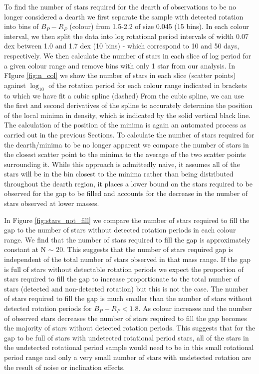 To find the number of stars required for the dearth of observations to be no longer considered a dearth we first separate the sample with detected rotation into bins of $B_P - R_P$ (colour) from 1.5-2.2 of size 0.045 (15 bins).
In each colour interval, we then split the data into log rotational period intervals of width 0.07 dex between 1.0 and 1.7 dex (10 bins) - which correspond to 10 and 50 days, respectively.
We then calculate the number of stars in each slice of log period for a given colour range and remove bins with only 1 star from our analysis.
In FIgure \ref{fig:n_col} we show the number of stars in each slice (scatter points) against $\log_{10}$ of the rotation period for each colour range indicated in brackets to which we have fit a cubic spline (dashed)
From the cubic spline, we can use the first and second derivatives of the spline to accurately determine the position of the local minima in density, which is indicated by the solid vertical black line.
The calculation of the position of the minima is again an automated process as carried out in the previous Sections.
To calculate the number of stars required for the dearth/minima to be no longer apparent we compare the number of stars in the closest scatter point to the minima to the average of the two scatter points surrounding it.
While this approach is admittedly naive, it assumes all of the stars will be in the bin closest to the minima rather than being distributed throughout the dearth region, it places a lower bound on the stars required to be observed for the gap to be filled and accounts for the decrease in the number of stars observed at lower masses.

In Figure \ref{fig:stars_not_fill} we compare the number of stars required to fill the gap to the number of stars without detected rotation periods in each colour range.
We find that the number of stars required to fill the gap is approximately constant at N $\sim$ 20.
This suggests that the number of stars required gap is independent of the total number of stars observed in that mass range.
If the gap is full of stars without detectable rotation periods we expect the proportion of stars required to fill the gap to increase proportionate to the total number of stars (detected and non-detected rotation) but this is not the case.
The number of stars required to fill the gap is much smaller than the number of stars without detected rotation periods for $B_P-R_P<1.8$.
As colour increases and the number of observed stars decreases the number of stars required to fill the gap becomes the majority of stars without detected rotation periods.
This suggests that for the gap to be full of stars with undetected rotational period stars, all of the stars in the undetected rotational period sample would need to be in this small rotational period range and only a very small number of stars with undetected rotation are the result of noise or inclination effects.

